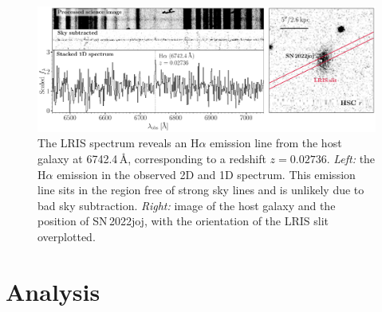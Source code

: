 \documentclass[twocolumn]{aastex631}
\newcommand{\sn}{SN\,2022joj}
\begin{document}
\begin{CJK*}{UTF8}{gbsn}
\begin{figure}
    \label{fig:spec_seq}
\end{figure}
\begin{figure}
    \centering
    \includegraphics[width=\linewidth]{host_spec.pdf}
    \caption{The LRIS spectrum reveals an H$\alpha$ emission line from the host galaxy at 6742.4\,\AA, corresponding to a redshift $z=0.02736$. \textit{Left:} the H$\alpha$ emission in the observed 2D and 1D spectrum. This emission line sits in the region free of strong sky lines and is unlikely due to bad sky subtraction.
    \textit{Right:} image of the host galaxy and the position of \sn, with the orientation of the LRIS slit overplotted.    
    }
    \label{fig:host_spec}
\end{figure}


\section{Analysis} \label{sec:analysis}

\end{CJK*}
\end{document}
